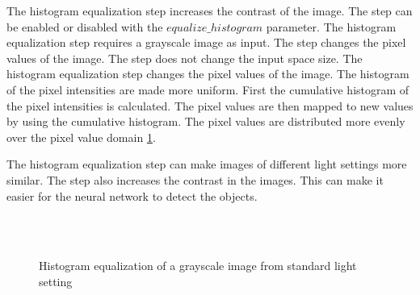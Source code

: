 The histogram equalization step increases the contrast of the image. The step can be enabled or disabled with the $equalize\_histogram$ parameter. The histogram equalization step requires a grayscale image as input. The step changes the pixel values of the image. The step does not change the input space size.
The histogram equalization step changes the pixel values of the image. The histogram of the pixel intensities are made more uniform. First the cumulative histogram of the pixel intensities is calculated. The pixel values are then mapped to new values by using the cumulative histogram. The pixel values are distributed more evenly over the pixel value domain \ref{fig:histogram_equalization}.

The histogram equalization step can make images of different light settings more similar. The step also increases the contrast in the images. This can make it easier for the neural network to detect the objects.

\begin{figure}
    \centering
    \\
    \\
    \caption{Histogram equalization of a grayscale image from standard light setting}
    \label{fig:histogram_equalization}
\end{figure}



